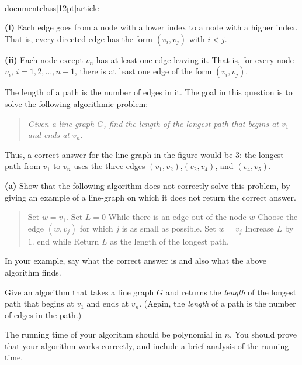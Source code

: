 \\documentclass[12pt]{article}
\begin{document}
\begin{enumerate}
{\bf (i)} 
Each edge goes from a node with a lower index
to a node with a higher index.
That is, every directed edge has the form 
$(v_i, v_j)$ with $i < j$.

\smallskip

{\bf (ii)} Each node except $v_n$ has at least one edge leaving it.
That is, for every node $v_i$, $i = 1, 2, \ldots, n-1$,
there is at least one edge of the form $(v_i,v_j)$.

\smallskip

The length of a path is the number of edges in it.
The goal in this question is to solve the following algorithmic
problem:
\begin{quote}
{\em Given a line-graph $G$, find the length of the longest path that begins 
at $v_1$ and ends at $v_n$.}
\end{quote}

Thus, a correct answer for the line-graph in the figure would be $3$:
the longest path from $v_1$ to $v_n$ uses the three edges
$(v_1, v_2)$,$(v_2, v_4)$, and $(v_4,v_5)$.

{\bf (a)}  Show that the following algorithm does not
correctly solve this problem, by giving an example of a line-graph on
which it does not return the correct answer.
\begin{quote}
\begin{code}
Set $w = v_1$.
Set $L = 0$
While there is an edge out of the node $w$
  Choose the edge $(w,v_j)$
     for which $j$ is as small as possible.
  Set $w = v_j$
  Increase $L$ by $1$.
end while
Return $L$ as the length of the longest path.
\end{code}
\end{quote}
In your example, say what the correct answer is and
also what the above algorithm finds.

Give an algorithm that takes a line graph $G$ and returns the
{\em length} of the longest path that begins at $v_1$ and ends at $v_n$.
(Again, the {\em length} of a path is the number of edges in the path.)

The running time of your algorithm should be polynomial in $n$.
You should prove that your algorithm works correctly, and include a 
brief analysis of the running time.

\end{enumerate}
\end{document}
